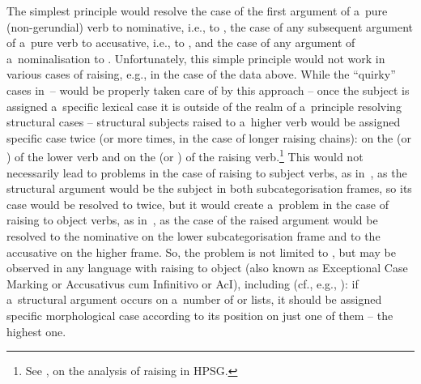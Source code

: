 \documentclass[output=paper,biblatex,babelshorthands,newtxmath,draftmode,colorlinks,citecolor=brown]{langscibook}
\begin{document}
The simplest principle would resolve the case of the first  argument of a~pure (non-gerundial) verb to nominative, i.e., to , the case of any subsequent  argument of a~pure verb to accusative, i.e., to , and the case of any  argument of a~nominalisation to .  Unfortunately, this simple principle would not work in various cases of raising, e.g., in the case of the  data above.  While the “quirky” cases in~– would be properly taken care of by this approach – once the subject is assigned a~specific lexical case it is outside of the realm of a~principle resolving structural cases – structural subjects raised to a~higher verb would be assigned specific case twice (or more times, in the case of longer raising chains): on the  (or ) of the lower verb and on the  (or ) of the raising verb.\footnote{See , on the analysis of raising in HPSG.}  This would not necessarily lead to problems in the case of raising to subject verbs, as in~, as the structural argument would be the subject in both subcategorisation frames, so its case would be resolved to  twice, but it would create a~problem in the case of raising to object verbs, as in~, as the case of the raised argument would be resolved to the nominative on the lower subcategorisation frame and to the accusative on the higher frame.  So, the problem is not limited to , but may be observed in any language with raising to object (also known as Exceptional Case Marking or Accusativus cum Infinitivo or AcI), including  (cf., e.g., \citealt[231]{HM94a}): if a~structural argument occurs on a~number of  or  lists, it should be assigned specific morphological case according to its position on just one of them – the highest one.
\end{document}
